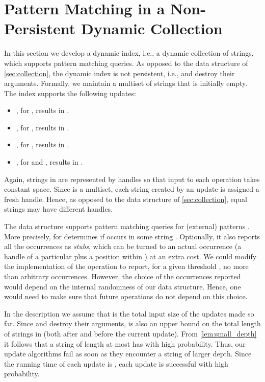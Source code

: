 \documentclass[a4paper]{article}
\theoremstyle{remark}
\begin{document}
\section{Pattern Matching in a Non-Persistent Dynamic Collection}\label{sec:pm}
In this section we develop a dynamic index, i.e., a dynamic collection
of strings, which supports pattern matching queries.
As opposed to the data structure of \cref{sec:collection}, the dynamic index is not persistent,
i.e.,  and  destroy their arguments.
Formally, we maintain a multiset  of strings that is initially empty.
The index supports the following updates:
\begin{itemize}
  \item , for , results in .
      \item , for , results in .
   \item , for , results in .
  \item , for  and , results in
    .
\end{itemize}

Again, strings in  are represented by handles so that input to each operation takes constant space.
Since  is a multiset, each string created by an update is assigned a fresh handle.
Hence, as opposed to the data structure of \cref{sec:collection}, equal strings may have different handles.

The data structure supports pattern matching queries for (external) patterns .
More precisely,  for  determines
if  occurs in some string .
Optionally, it also reports all the occurrences as \emph{stubs}, which can be turned to an actual occurrence
(a handle of a particular  plus a position within ) at an extra cost.
We could modify the implementation of the  operation to report, for a given threshold ,
no more than  arbitrary occurrences. However, the choice of the occurrences reported would depend on the internal randomness
of our data structure. Hence, one would need to make sure that future operations do not depend on this choice.


In the description we assume that  is the total input size of the updates made so far.
Since  and  destroy their arguments,  is also an upper bound on the total
length of strings in  (both after and before the current update).
From \cref{lem:small_depth} it follows that a string of length at most  has  with high probability.
Thus, our update algorithms fail as soon as they encounter a string of larger depth.
Since the running time of each update is , each update is successful with high probability.
\end{document}
